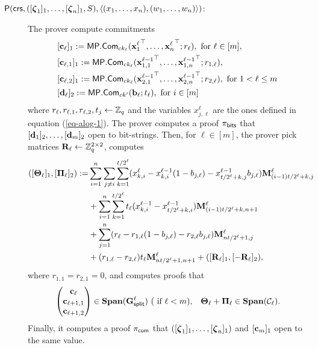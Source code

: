 \begin{description}
\item[{\(\mathsf{P}(\mathsf{crs}, ([{\boldsymbol \zeta}_1]_1, \ldots, [{\boldsymbol \zeta}_n]_1,S), \langle (x_1,\ldots,x_n),(w_1,\ldots,w_n) \rangle)\)}:]
The prover compute commitments
\begin{align*}
&[\mathbf{c}_\ell]_1:=\mathsf{MP}.\mathsf{Com}_{ck_\ell}({\mathbf{x}^\ell_1}^\top,\ldots,{\mathbf{x}^\ell_n}^\top;r_\ell), \text{ for } \ell \in [m],\\
&[\mathbf{c}_{\ell,1}]_1:=\mathsf{MP}.\mathsf{Com}_{ck_\ell}({\mathbf{x}^{\ell-1}_{1,1}}^\top,\ldots,{\mathbf{x}^{\ell-1}_{1,n}}^\top;r_{1,\ell}),\\
&[\mathbf{c}_{\ell,2}]_1:=\mathsf{MP}.\mathsf{Com}_{ck_\ell}({\mathbf{x}^{\ell-1}_{2,1}}^\top,\ldots,{\mathbf{x}^{\ell-1}_{2,n}}^\top;r_{2,\ell}), \text{ for } 1<\ell\leq m\\
&[\mathbf{d}_\ell]_2:=\mathsf{MP}.\mathsf{Com}_{ck'}(\mathbf{b}_\ell;t_\ell),\text{ for } i\in[m]
\end{align*}
 where \(r_\ell,r_{\ell,1},r_{\ell,2},t_j\gets\mathbb{Z}_q\) and the variables \(x^\ell_{j,\ell}\) are the ones defined in equation (\ref{eq-alog-1}). The prover computes a proof \(\pi_{\mathsf{bits}}\) that \([\mathbf{d}_1]_2,\ldots,[\mathbf{d}_m]_2\) open to bit-strings. Then, for \(\ell\in [m]\), the prover pick matrices \(\mathbf{{R}}_\ell\gets\mathbb{Z}_q^{2\times 2}\), computes
\begin{align*}
([\mathbf{{\Theta}}_\ell]_1,[\mathbf{{\Pi}}_\ell]_2)  := & \sum_{i=1}^n\sum_{j\neq i}\sum_{k=1}^{t /2^\ell}(x^\ell_{k,i}-x^{\ell-1}_{k,i}(1-b_{j,\ell})-x^{\ell-1}_{t /2^\ell+k,j}b_{j,\ell})\mathbf{{M}}_{(i-1)t /2^\ell+k,j}^\ell\\
&+ \sum_{i=1}^n\sum_{k=1}^{t /2^\ell}t_\ell(x^{\ell-1}_{k,i}-x^{\ell-1}_{t /2^{\ell}+k,i})\mathbf{{M}}_{(i-1)t /2^\ell+k,n+1}^\ell \\
&+ \sum_{j=1}^n (r_\ell-r_{1,\ell}(1-b_{j,\ell})-r_{2,\ell}b_{j,\ell})\mathbf{{M}}_{nt /2^\ell+1,j}^\ell \\
&+(r_{1,\ell}-r_{2,\ell})t_\ell\mathbf{{M}}^\ell_{nt /2^\ell+1,n+1}+([\mathbf{{R}}_\ell]_1,[-\mathbf{{R}}_\ell]_2),
\end{align*}
where \(r_{1,1}=r_{2,1}=0\), and computes proofs that
\begin{align*}
&\begin{pmatrix}
\mathbf{c}_{\ell}\\\mathbf{c}_{\ell+1,1}\\\mathbf{c}_{\ell+1,2}
\end{pmatrix}\in
\mathbf{Span}(\mathbf{{G}}^{\ell}_\mathsf{split})\ (\text{ if }\ell< m), &\mathbf{{\Theta_\ell}}+\mathbf{{\Pi_\ell}}\in\mathbf{Span}(\mathcal{C}_\ell).
\end{align*}
Finally, it computes a proof \(\pi_{\mathsf{com}}\) that \(([{\boldsymbol \zeta}_1]_1,\ldots,[{\boldsymbol \zeta}_n]_1)\) and \([\mathbf{c}_m]_1\) open to the same value.


\end{description}
